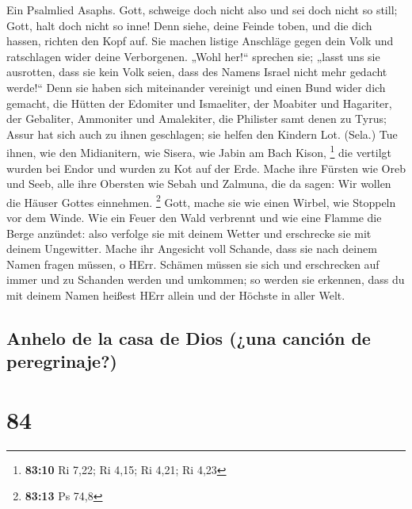  Ein Psalmlied Asaphs.  Gott, schweige doch
nicht also und sei doch nicht so still; Gott, halt doch nicht so inne!
 Denn siehe, deine Feinde toben, und die dich hassen,
richten den Kopf auf.  Sie machen listige Anschläge gegen
dein Volk und ratschlagen wider deine Verborgenen.  „Wohl
her!{}`` sprechen sie; „lasst uns sie ausrotten, dass sie kein Volk
seien, dass des Namens Israel nicht mehr gedacht werde!{}``
 Denn sie haben sich miteinander vereinigt und einen Bund
wider dich gemacht,  die Hütten der Edomiter und
Ismaeliter, der Moabiter und Hagariter,  der Gebaliter,
Ammoniter und Amalekiter, die Philister samt denen zu Tyrus;
 Assur hat sich auch zu ihnen geschlagen; sie helfen den
Kindern Lot. (Sela.)  Tue ihnen, wie den Midianitern, wie
Sisera, wie Jabin am Bach Kison, \footnote{\textbf{83:10} Ri 7,22; Ri
  4,15; Ri 4,21; Ri 4,23}  die vertilgt wurden bei Endor
und wurden zu Kot auf der Erde.  Mache ihre Fürsten wie
Oreb und Seeb, alle ihre Obersten wie Sebah und Zalmuna, 
die da sagen: Wir wollen die Häuser Gottes einnehmen. \footnote{\textbf{83:13}
  Ps 74,8}  Gott, mache sie wie einen Wirbel, wie
Stoppeln vor dem Winde.  Wie ein Feuer den Wald verbrennt
und wie eine Flamme die Berge anzündet:  also verfolge
sie mit deinem Wetter und erschrecke sie mit deinem Ungewitter.
 Mache ihr Angesicht voll Schande, dass sie nach deinem
Namen fragen müssen, o HErr.  Schämen müssen sie sich und
erschrecken auf immer und zu Schanden werden und umkommen;
 so werden sie erkennen, dass du mit deinem Namen heißest
HErr allein und der Höchste in aller Welt.

\hypertarget{anhelo-de-la-casa-de-dios-una-canciuxf3n-de-peregrinaje}{%
\subsection{Anhelo de la casa de Dios (¿una canción de
peregrinaje?)}\label{anhelo-de-la-casa-de-dios-una-canciuxf3n-de-peregrinaje}}

\hypertarget{section-83}{%
\section{84}\label{section-83}}

